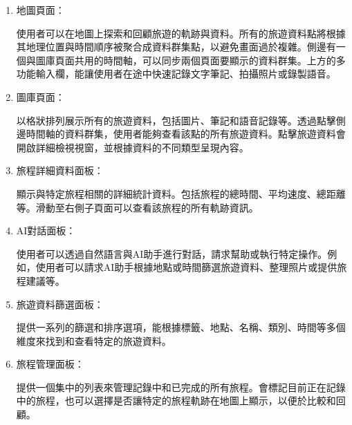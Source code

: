 \begin{enumerate}

    \item 地圖頁面：

    使用者可以在地圖上探索和回顧旅遊的軌跡與資料。所有的旅遊資料點將根據其地理位置與時間順序被聚合成資料群集點，以避免畫面過於複雜。側邊有一個與圖庫頁面共用的時間軸，可以同步兩個頁面要顯示的資料群集。上方的多功能輸入欄，能讓使用者在途中快速記錄文字筆記、拍攝照片或錄製語音。

    \item 圖庫頁面：

    以格狀排列展示所有的旅遊資料，包括圖片、筆記和語音記錄等。透過點擊側邊時間軸的資料群集，使用者能夠查看該點的所有旅遊資料。點擊旅遊資料會開啟詳細檢視視窗，並根據資料的不同類型呈現內容。

    \item 旅程詳細資料面板：

    顯示與特定旅程相關的詳細統計資料。包括旅程的總時間、平均速度、總距離等。滑動至右側子頁面可以查看該旅程的所有軌跡資訊。

    \item AI對話面板：

    使用者可以透過自然語言與AI助手進行對話，請求幫助或執行特定操作。例如，使用者可以請求AI助手根據地點或時間篩選旅遊資料、整理照片或提供旅程建議等。

    \item 旅遊資料篩選面板：

    提供一系列的篩選和排序選項，能根據標籤、地點、名稱、類別、時間等多個維度來找到和查看特定的旅遊資料。

    \item 旅程管理面板：

    提供一個集中的列表來管理記錄中和已完成的所有旅程。會標記目前正在記錄中的旅程，也可以選擇是否讓特定的旅程軌跡在地圖上顯示，以便於比較和回顧。

\end{enumerate}